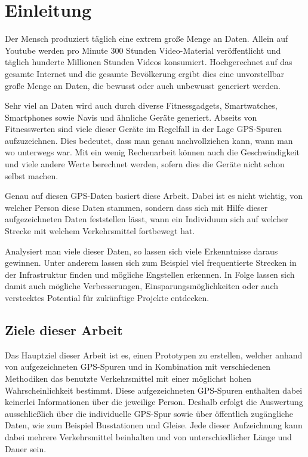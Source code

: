 \chapter{Einleitung}
Der Mensch produziert täglich eine extrem große Menge an Daten. Allein auf Youtube werden pro Minute 300 Stunden Video-Material veröffentlicht und täglich hunderte Millionen Stunden Videos konsumiert.  \cite{youtube_statistics_2015} Hochgerechnet auf das gesamte Internet und die gesamte Bevölkerung ergibt dies eine unvorstellbar große Menge an Daten, die bewusst oder auch unbewusst generiert werden. 

Sehr viel an Daten wird auch durch diverse Fitnessgadgets, Smartwatches, Smartphones sowie Navis und ähnliche Geräte generiert. Abseits von Fitnesswerten sind viele dieser Geräte im Regelfall in der Lage GPS-Spuren aufzuzeichnen. Dies bedeutet, dass man genau nachvollziehen kann, wann man wo unterwegs war. Mit ein wenig Rechenarbeit können auch die Geschwindigkeit und viele andere Werte berechnet werden, sofern dies die Geräte nicht schon selbst machen. 

Genau auf diesen GPS-Daten basiert diese Arbeit. Dabei ist es nicht wichtig, von welcher Person diese Daten stammen, sondern dass sich mit Hilfe dieser aufgezeichneten Daten feststellen lässt, wann ein Individuum sich auf welcher Strecke mit welchem Verkehrsmittel fortbewegt hat.

Analysiert man viele dieser Daten, so lassen sich viele Erkenntnisse daraus gewinnen. Unter anderem lassen sich zum Beispiel viel frequentierte Strecken in der Infrastruktur finden und mögliche Engstellen erkennen. In Folge lassen sich damit auch mögliche Verbesserungen, Einsparungsmöglichkeiten oder auch verstecktes Potential für zukünftige Projekte entdecken.

\section{Ziele dieser Arbeit}
Das Hauptziel dieser Arbeit ist es, einen Prototypen zu erstellen, welcher anhand von aufgezeichneten GPS-Spuren und in Kombination mit verschiedenen Methodiken das benutzte Verkehrsmittel mit einer möglichst hohen Wahrscheinlichkeit bestimmt. Diese aufgezeichneten GPS-Spuren enthalten dabei keinerlei Informationen über die jeweilige Person. Deshalb erfolgt die Auswertung ausschließlich über die individuelle GPS-Spur sowie über öffentlich zugängliche Daten, wie zum Beispiel Busstationen und Gleise. Jede dieser Aufzeichnung kann dabei mehrere Verkehrsmittel beinhalten und von unterschiedlicher Länge und Dauer sein.

